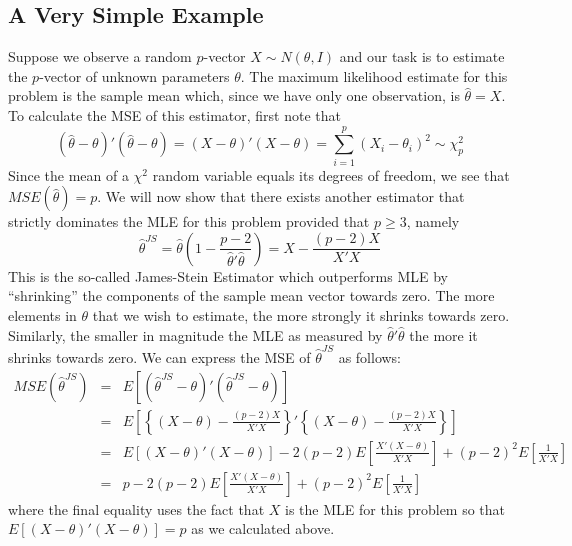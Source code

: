\subsection{A Very Simple Example}
Suppose we observe a random $p$-vector $X \sim N\left( \theta, I \right)$ and our task is to estimate the $p$-vector of unknown parameters $\theta$.
The maximum likelihood estimate for this problem is the sample mean which, since we have only one observation, is $\hat{\theta} = X$.
To calculate the MSE of this estimator, first note that
\begin{equation*}
  \left( \hat{\theta} - \theta \right)' \left( \hat{\theta}- \theta \right) = \left( X - \theta \right)'\left( X-\theta \right)= \sum_{i = 1}^{p} \left( X_{i} - \theta_i \right)^2 \sim \chi^2_p 
\end{equation*}
Since the mean of a $\chi^2$ random variable equals its degrees of freedom, we see that $MSE(\hat{\theta})=p$.
We will now show that there exists another estimator that strictly dominates the MLE for this problem provided that $p \geq 3$, namely
\begin{equation*}
  \hat{\theta}^{JS} = \hat{\theta}\left( 1 - \frac{p-2}{\hat{\theta}'\hat{\theta}} \right) = X - \frac{\left( p-2 \right)X}{X'X}
\end{equation*}
This is the so-called James-Stein Estimator which outperforms MLE by ``shrinking'' the components of the sample mean vector towards zero.
The more elements in $\theta$ that we wish to estimate, the more strongly it shrinks towards zero.
Similarly, the smaller in magnitude the MLE as measured by $\hat{\theta}'\hat{\theta}$ the more it shrinks towards zero.
We can express the MSE of $\hat{\theta}^{JS}$ as follows:
\begin{eqnarray*}
  MSE\left( \hat{\theta}^{JS} \right) &=& E\left[ \left( \hat{\theta}^{JS} - \theta \right)'\left( \hat{\theta}^{JS} - \theta \right) \right]\\
  &=& E\left[ \left\{ \left( X - \theta \right) - \frac{(p-2)X}{X'X} \right\}' \left\{ \left( X - \theta \right) - \frac{(p-2)X}{X'X} \right\} \right]  \\
  &=&E\left[ \left( X - \theta \right)'\left( X - \theta \right) \right] - 2 (p-2)E\left[ \frac{X'(X-\theta)}{X'X} \right] + \left( p-2 \right)^{2} E\left[ \frac{1}{X'X} \right] \\
  &=& p - 2 (p-2)E\left[ \frac{X'(X-\theta)}{X'X} \right] + \left( p-2 \right)^{2} E\left[ \frac{1}{X'X} \right]
\end{eqnarray*}
where the final equality uses the fact that $X$ is the MLE for this problem so that $E\left[ \left( X - \theta \right)'\left( X - \theta \right) \right]=p$ as we calculated above. 
